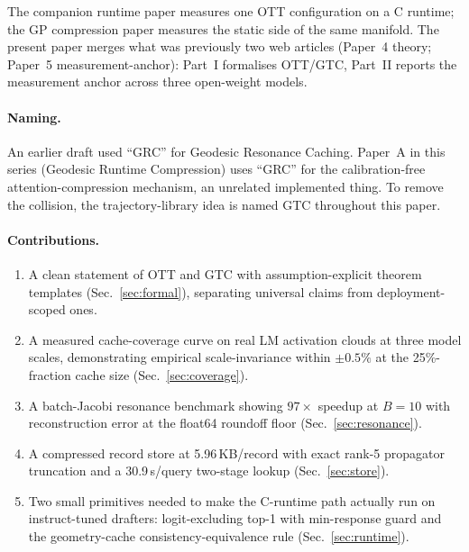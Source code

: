 \documentclass[11pt]{article}
\begin{document}
The companion runtime paper \cite{papers3specdec} measures one OTT
configuration on a C runtime; the GP compression paper
\cite{papers2geodesic_projection} measures the static side of the same
manifold. The present paper merges what was previously two web articles
(Paper~4 theory; Paper~5 measurement-anchor): Part~I formalises OTT/GTC,
Part~II reports the measurement anchor across three open-weight models.

\paragraph{Naming.} An earlier draft used ``GRC'' for Geodesic Resonance
Caching. Paper~A in this series (Geodesic Runtime Compression) uses ``GRC''
for the calibration-free attention-compression mechanism, an unrelated
implemented thing. To remove the collision, the trajectory-library idea is
named GTC throughout this paper.

\paragraph{Contributions.}
\begin{enumerate}
  \item A clean statement of OTT and GTC with assumption-explicit theorem
        templates (Sec.~\ref{sec:formal}), separating universal claims from
        deployment-scoped ones.
  \item A measured cache-coverage curve on real LM activation clouds at three
        model scales, demonstrating empirical scale-invariance within
        $\pm 0.5\%$ at the 25\%-fraction cache size (Sec.~\ref{sec:coverage}).
  \item A batch-Jacobi resonance benchmark showing $97\times$ speedup at
        $B=10$ with reconstruction error at the float64 roundoff floor
        (Sec.~\ref{sec:resonance}).
  \item A compressed record store at 5.96\,KB/record with exact rank-5
        propagator truncation and a 30.9\,\textmu s/query two-stage lookup
        (Sec.~\ref{sec:store}).
  \item Two small primitives needed to make the C-runtime path actually run on
        instruct-tuned drafters: logit-excluding top-1 with min-response
        guard and the geometry-cache consistency-equivalence rule
        (Sec.~\ref{sec:runtime}).
\end{enumerate}
\end{document}
